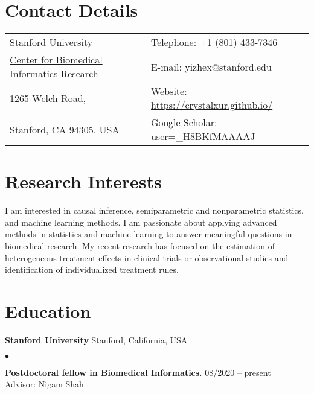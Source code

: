 \documentclass[margin,line]{res}
\newenvironment{list2}{
  \begin{list}{$\bullet$}{%
      \setlength{\itemsep}{0in}
      \setlength{\parsep}{0in} \setlength{\parskip}{0in}
      \setlength{\topsep}{0in} \setlength{\partopsep}{0in}
      \setlength{\leftmargin}{0.2in}}}{\end{list}}
\begin{document}

\begin{resume}
\section{\sc Contact Details}
\vspace{.05in}
\begin{tabular}{@{}p{3in}p{4in}}
Stanford University             & {Telephone:}  +1 (801) 433-7346 \\
\href{https://bmir.stanford.edu}{Center for Biomedical Informatics Research}  & {E-mail:}    yizhex@stanford.edu \\
1265 Welch Road, &  {Website:} \href{https://crystalxur.github.io/}{https://crystalxur.github.io/}\\
Stanford, CA 94305, USA  & {Google Scholar:} \href{https://scholar.google.com/citations?view_op=list_works&hl=en&user=_H8BKfMAAAAJ}{user=\_H8BKfMAAAAJ} \\
\end{tabular}



\section{\sc Research Interests}
I am interested in causal inference, semiparametric and nonparametric statistics, and machine learning methods. I am passionate about applying advanced methods in statistics and machine learning to answer meaningful questions in biomedical research. My recent research has focused on the estimation of heterogeneous treatment effects in clinical trials or observational studies and identification of individualized treatment rules.

\section{\sc Education}
{\bf Stanford University} \hfill Stanford, California, USA\\
\vspace*{-.14in}
\begin{list2}
\item
\textbf{Postdoctoral fellow in Biomedical Informatics.} \hfill  08/2020 -- present\\
Advisor: Nigam Shah
\end{list2}


\end{resume}
\end{document}
